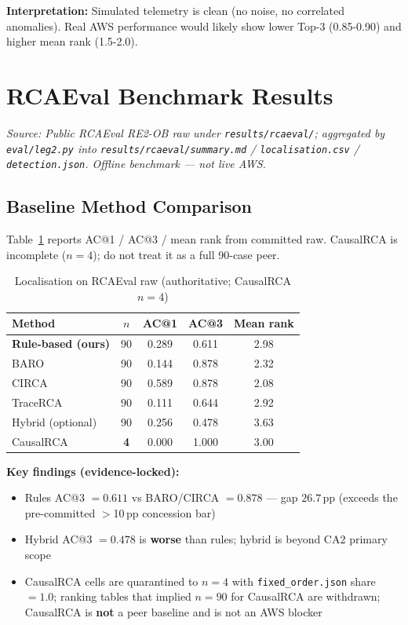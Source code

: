 \textbf{Interpretation:} Simulated telemetry is clean (no noise, no correlated anomalies). Real AWS performance would likely show lower Top-3 (0.85-0.90) and higher mean rank (1.5-2.0).

\section{RCAEval Benchmark Results}
\label{sec:rcaeval_results}

\textit{Source: Public RCAEval RE2-OB raw under \texttt{results/rcaeval/}; aggregated by \texttt{eval/leg2.py} into \texttt{results/rcaeval/summary.md} / \texttt{localisation.csv} / \texttt{detection.json}. Offline benchmark --- not live AWS.}

\subsection{Baseline Method Comparison}

Table~\ref{tab:rcaeval_comparison} reports AC@1 / AC@3 / mean rank from committed raw. CausalRCA is incomplete ($n{=}4$); do not treat it as a full 90-case peer.

\begin{table}[h]
\centering
\caption{Localisation on RCAEval raw (authoritative; CausalRCA $n{=}4$)}
\label{tab:rcaeval_comparison}
\begin{tabular}{lcccc}
\hline
\textbf{Method} & \textbf{$n$} & \textbf{AC@1} & \textbf{AC@3} & \textbf{Mean rank} \\
\hline
\textbf{Rule-based (ours)} & 90 & 0.289 & 0.611 & 2.98 \\
BARO & 90 & 0.144 & 0.878 & 2.32 \\
CIRCA & 90 & 0.589 & 0.878 & 2.08 \\
TraceRCA & 90 & 0.111 & 0.644 & 2.92 \\
Hybrid (optional) & 90 & 0.256 & 0.478 & 3.63 \\
CausalRCA & \textbf{4} & 0.000 & 1.000 & 3.00 \\
\hline
\end{tabular}
\end{table}

\textbf{Key findings (evidence-locked):}
\begin{itemize}
    \item Rules AC@3 $=0.611$ vs BARO/CIRCA $=0.878$ --- gap $26.7$\,pp (exceeds the pre-committed $>$10\,pp concession bar)
    \item Hybrid AC@3 $=0.478$ is \textbf{worse} than rules; hybrid is beyond CA2 primary scope
    \item CausalRCA cells are quarantined to $n{=}4$ with \texttt{fixed\_order.json} share$=1.0$; ranking tables that implied $n{=}90$ for CausalRCA are withdrawn; CausalRCA is \textbf{not} a peer baseline and is not an AWS blocker
\end{itemize}

